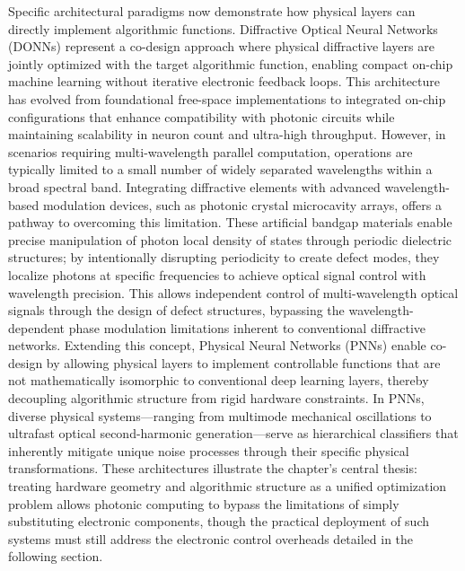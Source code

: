 \documentclass[11pt]{article}
\begin{document}
Specific architectural paradigms now demonstrate how physical layers can directly implement algorithmic functions. Diffractive Optical Neural Networks (DONNs) represent a co-design approach where physical diffractive layers are jointly optimized with the target algorithmic function, enabling compact on-chip machine learning without iterative electronic feedback loops. This architecture has evolved from foundational free-space implementations to integrated on-chip configurations that enhance compatibility with photonic circuits while maintaining scalability in neuron count and ultra-high throughput. However, in scenarios requiring multi-wavelength parallel computation, operations are typically limited to a small number of widely separated wavelengths within a broad spectral band. Integrating diffractive elements with advanced wavelength-based modulation devices, such as photonic crystal microcavity arrays, offers a pathway to overcoming this limitation. These artificial bandgap materials enable precise manipulation of photon local density of states through periodic dielectric structures; by intentionally disrupting periodicity to create defect modes, they localize photons at specific frequencies to achieve optical signal control with wavelength precision. \citep{doi_10_1371_journal_pone_0341241_2b7bcccf} \citep{doi_10_1109_isset62871_2024_10779731_6ff2a9a8} This allows independent control of multi-wavelength optical signals through the design of defect structures, bypassing the wavelength-dependent phase modulation limitations inherent to conventional diffractive networks. Extending this concept, Physical Neural Networks (PNNs) enable co-design by allowing physical layers to implement controllable functions that are not mathematically isomorphic to conventional deep learning layers, thereby decoupling algorithmic structure from rigid hardware constraints. In PNNs, diverse physical systems---ranging from multimode mechanical oscillations to ultrafast optical second-harmonic generation---serve as hierarchical classifiers that inherently mitigate unique noise processes through their specific physical transformations. These architectures illustrate the chapter's central thesis: treating hardware geometry and algorithmic structure as a unified optimization problem allows photonic computing to bypass the limitations of simply substituting electronic components, though the practical deployment of such systems must still address the electronic control overheads detailed in the following section. \citep{doi_10_1002_nap2_70098_8d5f2f8a} \citep{doi_10_1038_s41586_021_04223_6_6158a5ea} \citep{doi_10_1515_nanoph_2025_0168_86a0f7aa}
\end{document}
